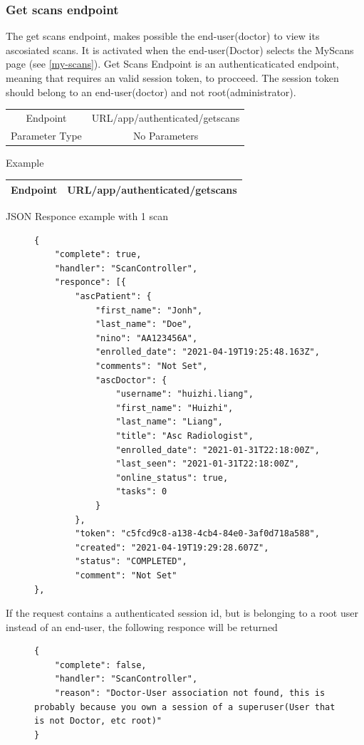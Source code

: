 				\subsubsection{Get scans endpoint}
					The get scans  endpoint, makes possible the end-user(doctor) to view its ascosiated scans. It is activated when the 
					end-user(Doctor) selects the MyScans page (see \ref{my-scans}). 
					Get Scans Endpoint is an authenticaticated endpoint, meaning that requires an valid session token, to procceed. 
					The session token should belong to an end-user(doctor) and not root(administrator).
					\begin{center}
						\begin{tabular}{ |c|c| } 
							\hline
							Endpoint & {{URL}}/app/authenticated/getscans\\
							Parameter Type & No Parameters  \\
							\hline
						\end{tabular}
					\end{center}
					Example
					\begin{center}
						\begin{tabular}{ |c|c| } 
							\hline
							Endpoint & {{URL}}/app/authenticated/getscans\\
							\hline
						\end{tabular}
					\end{center}
					JSON Responce example with 1 scan
					\begin{figure}[H]
						\iftrue
						\begin{lstlisting}[]
{
	"complete": true,
	"handler": "ScanController",
	"responce": [{
		"ascPatient": {
			"first_name": "Jonh",
			"last_name": "Doe",
			"nino": "AA123456A",
			"enrolled_date": "2021-04-19T19:25:48.163Z",
			"comments": "Not Set",
			"ascDoctor": {
				"username": "huizhi.liang",
				"first_name": "Huizhi",
				"last_name": "Liang",
				"title": "Asc Radiologist",
				"enrolled_date": "2021-01-31T22:18:00Z",
				"last_seen": "2021-01-31T22:18:00Z",
				"online_status": true,
				"tasks": 0
			}
		},
		"token": "c5fcd9c8-a138-4cb4-84e0-3af0d718a588",
		"created": "2021-04-19T19:29:28.607Z",
		"status": "COMPLETED",
		"comment": "Not Set"
},
						\end{lstlisting}
					\end{figure}
					If the request contains a authenticated session id, but is belonging to a root user instead of an end-user, the
					following responce will be returned
					\begin{figure}[H]
						\iftrue
						\begin{lstlisting}[]
{	
	"complete": false,
	"handler": "ScanController",
	"reason": "Doctor-User association not found, this is probably because you own a session of a superuser(User that is not Doctor, etc root)"
}
						\end{lstlisting}
					\end{figure}
